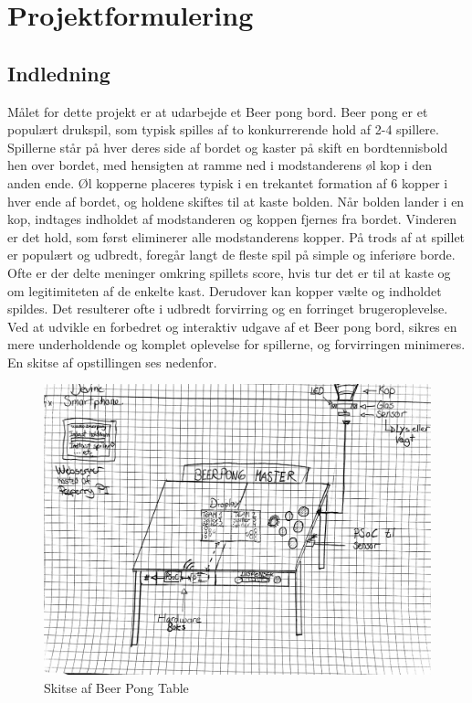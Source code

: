 \documentclass[a4paper,12pt,fleqn,oneside]{article}
\begin{document}

\section{Projektformulering}
\subsection{Indledning}
Målet for dette projekt er at udarbejde et Beer pong bord. Beer pong er et populært drukspil, som typisk spilles af to konkurrerende hold af 2-4 spillere. Spillerne står på hver deres side af bordet og kaster på skift en bordtennisbold hen over bordet, med hensigten at ramme ned i modstanderens øl kop i den anden ende. Øl kopperne placeres typisk i en trekantet formation af 6 kopper i hver ende af bordet, og holdene skiftes til at kaste bolden. Når bolden lander i en kop, indtages indholdet af modstanderen og koppen fjernes fra bordet. Vinderen er det hold, som først eliminerer alle modstanderens kopper. 
På trods af at spillet er populært og udbredt, foregår langt de fleste spil på simple og inferiøre borde. Ofte er der delte meninger omkring spillets score, hvis tur det er til at kaste og om legitimiteten af de enkelte kast. Derudover kan kopper vælte og indholdet spildes. Det resulterer ofte i udbredt forvirring og en forringet brugeroplevelse.  Ved at udvikle en forbedret og interaktiv udgave af et Beer pong bord, sikres en mere underholdende og komplet oplevelse for spillerne, og forvirringen minimeres. En skitse af opstillingen ses nedenfor.
\begin{figure}[H]
    \centering
    \includegraphics[width=\textwidth]{Projektformulering/graphics/BeerPong_oprindelig_skitse.png}
    \caption{Skitse af Beer Pong Table}
    \label{fig:ShiftRegPWM_test}
\end{figure}
\end{document}
